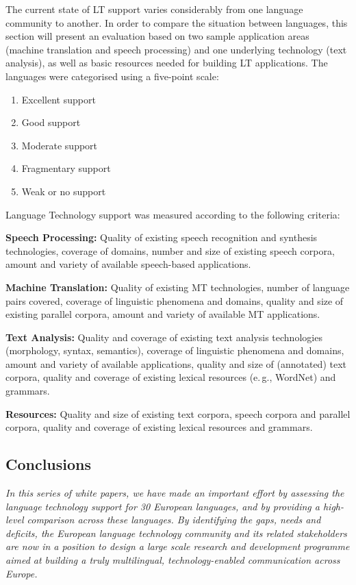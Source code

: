 \documentclass[]{../../metanetpaper}
\begin{document}
\begin{multicols}{2}
The current state of LT support varies considerably from one language community to another. In order to compare the situation between languages, this section will present an evaluation based on two sample application areas (machine translation and speech processing) and one underlying technology (text analysis), as well as basic resources needed for building LT applications. The languages were categorised using a five-point scale: 

\begin{enumerate}
\item Excellent support
\item Good support
\item Moderate support
\item Fragmentary support
\item Weak or no support
\end{enumerate}

Language Technology support was measured according to the following criteria:

\textbf{Speech Processing:} Quality of existing speech recognition and synthesis technologies, coverage of domains, number and size of existing speech corpora, amount and variety of available speech-based applications.

\textbf{Machine Translation:} Quality of existing MT technologies, number of language pairs covered, coverage of linguistic phenomena and domains, quality and size of existing parallel corpora, amount and variety of available MT applications.

\textbf{Text Analysis:} Quality and coverage of existing text analysis technologies (morphology, syntax, semantics), coverage of linguistic phenomena and domains, amount and variety of available applications, quality and size of (annotated) text corpora, quality and coverage of existing lexical resources (e.\,g., WordNet) and grammars.

\textbf{Resources:} Quality and size of existing text corpora, speech corpora and parallel corpora, quality and coverage of existing lexical resources and grammars.

\subsection{Conclusions}

\emph{In this series of white papers, we have made an important effort by assessing the language technology support for 30 European languages, and by providing a high-level comparison across these languages. By identifying the gaps, needs and deficits, the European language technology community and its related stakeholders are now in a position to design a large scale research and development programme aimed at building a truly multilingual, technology-enabled communication across Europe.}


\end{multicols}
\end{document}
